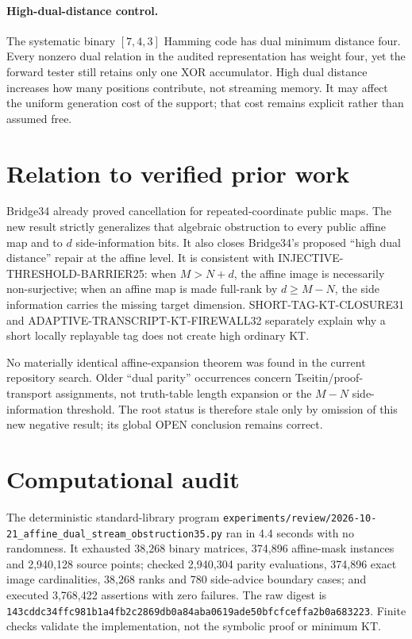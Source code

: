 \documentclass[11pt]{article}
\begin{document}
\paragraph{High-dual-distance control.}
The systematic binary $[7,4,3]$ Hamming code has dual minimum distance four.
Every nonzero dual relation in the audited representation has weight four,
yet the forward tester still retains only one XOR accumulator.  High dual
distance increases how many positions contribute, not streaming memory.  It
may affect the uniform generation cost of the support; that cost remains
explicit rather than assumed free.

\section*{Relation to verified prior work}
Bridge34 already proved cancellation for repeated-coordinate public maps.  The
new result strictly generalizes that algebraic obstruction to every public
affine map and to $d$ side-information bits.  It also closes Bridge34's proposed
``high dual distance'' repair at the affine level.  It is consistent with
INJECTIVE-THRESHOLD-BARRIER25: when $M>N+d$, the affine image is necessarily
non-surjective; when an affine map is made full-rank by $d\ge M-N$, the side
information carries the missing target dimension.  SHORT-TAG-KT-CLOSURE31 and
ADAPTIVE-TRANSCRIPT-KT-FIREWALL32 separately explain why a short locally
replayable tag does not create high ordinary KT.

No materially identical affine-expansion theorem was found in the current
repository search.  Older ``dual parity'' occurrences concern Tseitin/proof-
transport assignments, not truth-table length expansion or the $M-N$ side-
information threshold.  The root status is therefore stale only by omission
of this new negative result; its global OPEN conclusion remains correct.

\section*{Computational audit}
The deterministic standard-library program
\nolinkurl{experiments/review/2026-10-21_affine_dual_stream_obstruction35.py}
ran in 4.4 seconds with no randomness.  It exhausted 38,268 binary matrices,
374,896 affine-mask instances and 2,940,128 source points; checked 2,940,304
parity evaluations, 374,896 exact image cardinalities, 38,268 ranks and 780
side-advice boundary cases; and executed 3,768,422 assertions with zero
failures.  The raw digest is
\texttt{143cddc34ffc981b1a4fb2c2869db0a84aba0619ade50bfcfceffa2b0a683223}.
Finite checks validate the implementation, not the symbolic proof or minimum
KT.
\end{document}
